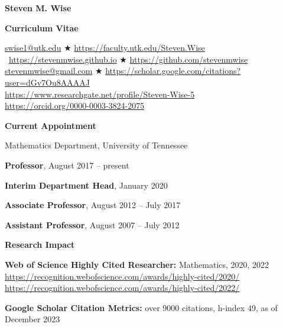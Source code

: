 \documentclass[11pt]{letter}
\begin{document}
    
    \begin{center}
    
{\Huge\bf  Steven M. Wise}

{\Large\bf  Curriculum Vitae}


\url{swise1@utk.edu}  $\bigstar$  \url{https://faculty.utk.edu/Steven.Wise}
	\
\url{https://stevenmwise.github.io}  $\bigstar$    \url{https://github.com/stevenmwise}
	\\
\url{stevenmwise@gmail.com}  $\bigstar$   \url{https://scholar.google.com/citations?user=dGv7Ou8AAAAJ}
	\\
\url{https://www.researchgate.net/profile/Steven-Wise-5}
	\\
\url{https://orcid.org/0000-0003-3824-2075}
    \end{center}

    \medskip

{\LARGE\bf  Current Appointment}
    \begin{description}
    \item
Mathematics Department, University of Tennessee
	\begin{description}
	\item
\textbf{Professor}, August 2017 -- present
	\item
\textbf{Interim Department Head}, January 2020
	\item
\textbf{Associate Professor}, August 2012 -- July 2017
	\item
\textbf{Assistant Professor}, August 2007 -- July 2012
	\end{description}
	\end{description}
	
	\smallskip
	
{\LARGE\bf  Research Impact}
    \begin{description}
    \item
\textbf{Web of Science Highly Cited Researcher:} Mathematics, 2020, 2022
	\\
\url{https://recognition.webofscience.com/awards/highly-cited/2020/}
	\\
\url{https://recognition.webofscience.com/awards/highly-cited/2022/}
   	\item
\textbf{Google Scholar Citation Metrics:} over 9000 citations, h-index 49, as of December 2023
    \end{description}
    
    \smallskip
	
\end{document}

